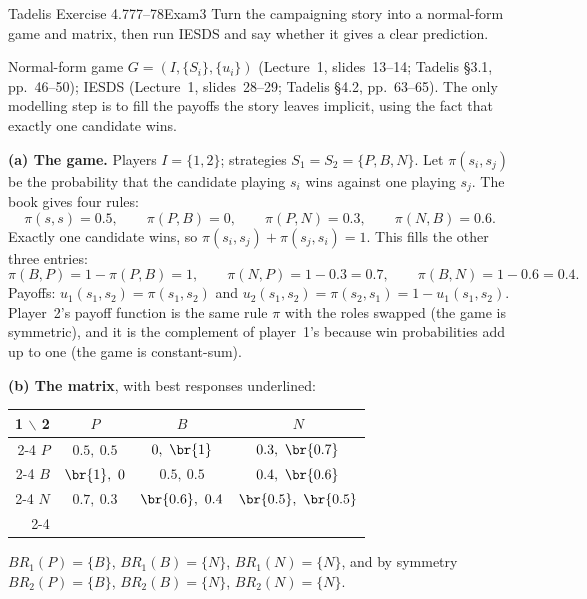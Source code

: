 \begin{exsol}{Tadelis Exercise 4.7}{77--78}{Exam}{3}
\asked Turn the campaigning story into a normal-form game and matrix, then run IESDS and say
whether it gives a clear prediction.

\method Normal-form game $G = (I, \{S_i\}, \{u_i\})$ (Lecture~1, slides~13--14; Tadelis \S3.1,
pp.~46--50); IESDS (Lecture~1, slides~28--29; Tadelis \S4.2, pp.~63--65). The only modelling step
is to fill the payoffs the story leaves implicit, using the fact that exactly one candidate wins.

\solution
\textbf{(a) The game.} Players $I = \{1, 2\}$; strategies $S_1 = S_2 = \{P, B, N\}$. Let
$\pi(s_i, s_j)$ be the probability that the candidate playing $s_i$ wins against one playing
$s_j$. The book gives four rules:
\[
  \pi(s,s) = 0.5,\qquad \pi(P,B) = 0,\qquad \pi(P,N) = 0.3,\qquad \pi(N,B) = 0.6 .
\]
Exactly one candidate wins, so $\pi(s_i,s_j) + \pi(s_j,s_i) = 1$. This fills the other three
entries:
\[
  \pi(B,P) = 1 - \pi(P,B) = 1,\qquad \pi(N,P) = 1 - 0.3 = 0.7,\qquad \pi(B,N) = 1 - 0.6 = 0.4 .
\]
Payoffs: $u_1(s_1,s_2) = \pi(s_1,s_2)$ and $u_2(s_1,s_2) = \pi(s_2,s_1) = 1 - u_1(s_1,s_2)$.
Player~2's payoff function is the same rule $\pi$ with the roles swapped (the game is
symmetric), and it is the complement of player~1's because win probabilities add up to one (the
game is constant-sum).

\textbf{(b) The matrix}, with best responses underlined:
\begin{center}
\begin{tabular}{r|c|c|c|}
\multicolumn{1}{r}{1 $\backslash$ 2} & \multicolumn{1}{c}{$P$} & \multicolumn{1}{c}{$B$} & \multicolumn{1}{c}{$N$}\\ \cline{2-4}
$P$ & $0.5,\ 0.5$ & $0,\ \br{1}$ & $0.3,\ \br{0.7}$ \\ \cline{2-4}
$B$ & $\br{1},\ 0$ & $0.5,\ 0.5$ & $0.4,\ \br{0.6}$ \\ \cline{2-4}
$N$ & $0.7,\ 0.3$ & $\br{0.6},\ 0.4$ & $\br{0.5},\ \br{0.5}$ \\ \cline{2-4}
\end{tabular}
\end{center}
$BR_1(P) = \{B\}$, $BR_1(B) = \{N\}$, $BR_1(N) = \{N\}$, and by symmetry
$BR_2(P) = \{B\}$, $BR_2(B) = \{N\}$, $BR_2(N) = \{N\}$.


\end{exsol}
